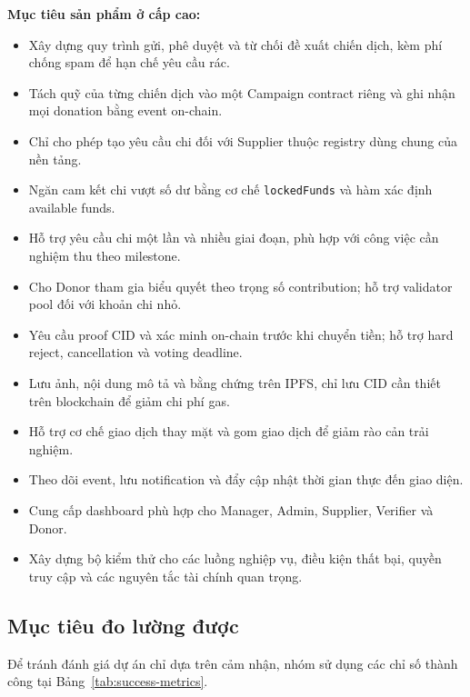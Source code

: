 \textbf{Mục tiêu sản phẩm ở cấp cao:}

\begin{itemize}
  \item Xây dựng quy trình gửi, phê duyệt và từ chối đề xuất chiến dịch, kèm phí chống spam để hạn chế yêu cầu rác.
  \item Tách quỹ của từng chiến dịch vào một Campaign contract riêng và ghi nhận mọi donation bằng event on-chain.
  \item Chỉ cho phép tạo yêu cầu chi đối với Supplier thuộc registry dùng chung của nền tảng.
  \item Ngăn cam kết chi vượt số dư bằng cơ chế \texttt{lockedFunds} và hàm xác định available funds.
  \item Hỗ trợ yêu cầu chi một lần và nhiều giai đoạn, phù hợp với công việc cần nghiệm thu theo milestone.
  \item Cho Donor tham gia biểu quyết theo trọng số contribution; hỗ trợ validator pool đối với khoản chi nhỏ.
  \item Yêu cầu proof CID và xác minh on-chain trước khi chuyển tiền; hỗ trợ hard reject, cancellation và voting deadline.
  \item Lưu ảnh, nội dung mô tả và bằng chứng trên IPFS, chỉ lưu CID cần thiết trên blockchain để giảm chi phí gas.
  \item Hỗ trợ cơ chế giao dịch thay mặt và gom giao dịch để giảm rào cản trải nghiệm.
  \item Theo dõi event, lưu notification và đẩy cập nhật thời gian thực đến giao diện.
  \item Cung cấp dashboard phù hợp cho Manager, Admin, Supplier, Verifier và Donor.
  \item Xây dựng bộ kiểm thử cho các luồng nghiệp vụ, điều kiện thất bại, quyền truy cập và các nguyên tắc tài chính quan trọng.
\end{itemize}

\fi
\subsection{Mục tiêu đo lường được}

Để tránh đánh giá dự án chỉ dựa trên cảm nhận, nhóm sử dụng các chỉ số thành công tại Bảng~\ref{tab:success-metrics}.

